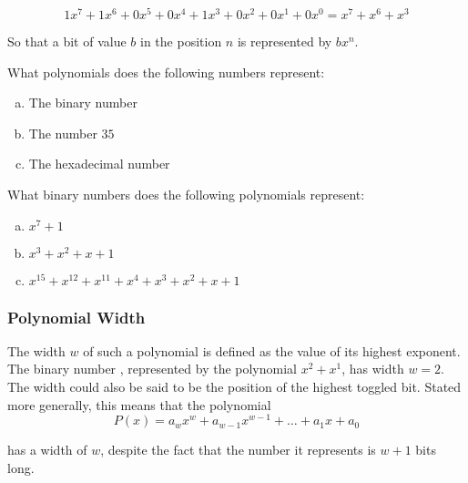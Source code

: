 \begin{equation*}
  1x^7 + 1x^6 + 0x^5 + 0x^4 + 1x^3 + 0x^2 + 0x^1 + 0x^0 = x^7 + x^6 + x^3
\end{equation*}

So that a bit of value $b$ in the position $n$ is represented by
$bx^n$.

\begin{Exercise}[label={bin-to-poly}]

  What polynomials does the following numbers represent:

  \begin{enumerate}[(a)]
  \item The binary number 
  \item The number $35$
  \item The hexadecimal number 
  \end{enumerate}

\end{Exercise}

\begin{Exercise}[label={poly-to-bin}]

  What binary numbers does the following polynomials represent:

  \begin{enumerate}[(a)]
  \item $x^7 + 1$
  \item $x^3 + x^2 + x + 1$
  \item $x^{15} + x^{12} + x^{11} + x^4 + x^3 + x^2 + x + 1$
  \end{enumerate}

\end{Exercise}

\subsubsection{Polynomial Width}

The width $w$ of such a polynomial is defined as the value of its
highest exponent. The binary number , represented by the
polynomial $x^2 + x^1$, has width $w=2$. The width could also be said to
be the position of the highest toggled bit. Stated more generally,
this means that the polynomial
\begin{equation*}
  P(x) = a_wx^w + a_{w-1}x^{w-1} + \ldots + a_{1}x + a_{0}
\end{equation*}

has a width of $w$, despite the fact that the number it represents is
$w + 1$ bits long.

